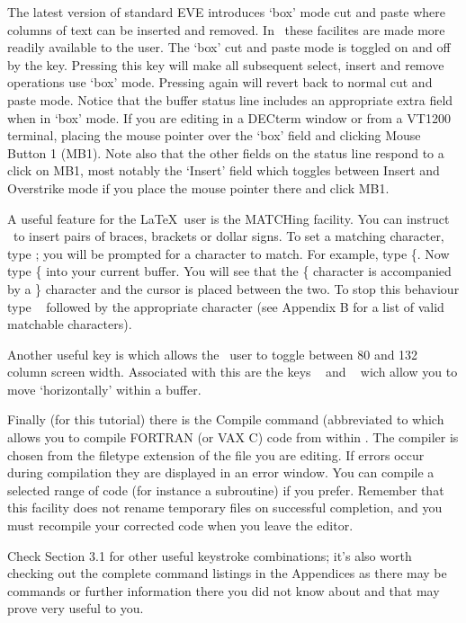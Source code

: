 The latest version of standard EVE introduces `box' mode cut and paste where
columns of text can be inserted and removed. In \STEve\ these facilites are
made more readily available to the user. The `box' cut and paste mode is
toggled on and off by the  key. Pressing this key will make all
subsequent select, insert and remove operations use `box' mode. Pressing
 again will revert back to normal cut and paste mode. Notice that
the buffer status line includes an appropriate extra field when in `box' mode.
If you are editing in a DECterm window or from a VT1200 terminal, placing the
mouse pointer over the `box' field and clicking Mouse Button 1 (MB1). Note also
that the other fields on the status line respond to a click on MB1, most
notably the `Insert' field which toggles between Insert and Overstrike mode if
you place the mouse pointer there and click MB1.

A useful feature for the \LaTeX\ user is the MATCHing facility. You can
instruct \STEve\ to insert pairs of braces, brackets or dollar signs. To set a
matching character, type ; you will be prompted for a character to
match. For example, type \{. Now type \{ into your current buffer. You will see
that the \{ character is accompanied by a \} character and the cursor is placed
between the two. To stop this behaviour type \gold\  followed by
the appropriate character (see Appendix B for a list of valid matchable
characters).

Another useful key is  which allows the \STEve\ user to toggle
between 80 and 132 column screen width. Associated with this are the keys
\gold\ \keyname{$\rhd$} and \gold\ \keyname{$\lhd$} wich allow you to move
`horizontally' within a buffer.

Finally (for this tutorial) there is the Compile command (abbreviated to
  which allows you to compile FORTRAN (or VAX C) code
from within \STEve. The compiler is chosen from the filetype extension of the
file you are editing. If errors occur during compilation they are displayed in
an error window. You can compile a selected range of code (for instance a
subroutine) if you prefer. Remember that this facility does not rename
temporary files on successful completion, and you must recompile your corrected
code when you leave the editor.

Check Section 3.1 for other useful keystroke combinations; it's also worth
checking out the complete command listings in the Appendices as there may be
commands or further information there you did not know about and that may prove
very useful to you.


